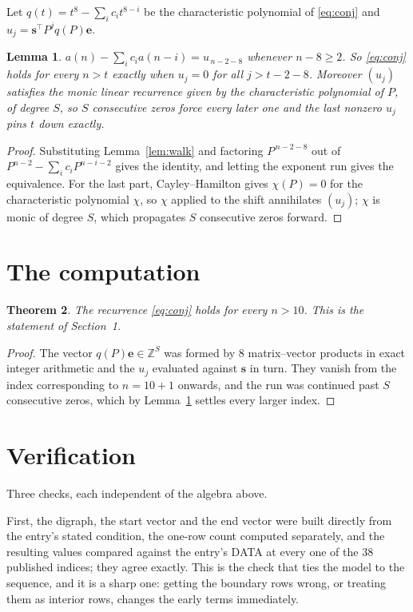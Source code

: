 \documentclass[11pt,a4paper]{article}
\theoremstyle{plain}
\newtheorem{theorem}{Theorem}
\newtheorem{lemma}[theorem]{Lemma}
\theoremstyle{definition}
\begin{document}
Let $q(t)=t^{8}-\sum_i c_i t^{8-i}$ be the characteristic polynomial of
\eqref{eq:conj} and $u_j=\mathbf{s}^{\!\top}P^{j}q(P)\mathbf{e}$.

\begin{lemma}\label{lem:crit}
$a(n)-\sum_i c_i a(n-i)=u_{\,n-2-8}$ whenever $n-8\ge2$. So \eqref{eq:conj}
holds for every $n>t$ exactly when $u_j=0$ for all $j>t-2-8$. Moreover $(u_j)$
satisfies the monic linear recurrence given by the characteristic polynomial of $P$, of
degree $S$, so $S$ consecutive zeros force every later one and the last nonzero $u_j$ pins
$t$ down exactly.
\end{lemma}

\begin{proof}
Substituting Lemma~\ref{lem:walk} and factoring $P^{\,n-2-8}$ out of
$P^{n-2}-\sum_i c_i P^{n-i-2}$ gives the identity, and letting the exponent run gives the
equivalence. For the last part, Cayley--Hamilton gives $\chi(P)=0$ for the characteristic
polynomial $\chi$, so $\chi$ applied to the shift annihilates $(u_j)$; $\chi$ is monic of
degree $S$, which propagates $S$ consecutive zeros forward.
\end{proof}

\section{The computation}

\begin{theorem}
The recurrence \eqref{eq:conj} holds for every $n>10$. This is the statement of
Section~1.
\end{theorem}

\begin{proof}
The vector $q(P)\mathbf{e}\in\mathbb{Z}^{S}$ was formed by $8$ matrix--vector
products in exact integer arithmetic and the $u_j$ evaluated against $\mathbf{s}$ in turn.
They vanish from the index corresponding to $n=10+1$ onwards, and the run was continued
past $S$ consecutive zeros, which by Lemma~\ref{lem:crit} settles every larger index.
\end{proof}

\section{Verification}

Three checks, each independent of the algebra above.

First, the digraph, the start vector and the end vector were built directly from the
entry's stated condition, the one-row count computed separately, and the resulting values
compared against the entry's DATA at every one of the $38$ published indices; they
agree exactly. This is the check that ties the model to the sequence, and it is a sharp one:
getting the boundary rows wrong, or treating them as interior rows, changes the early terms
immediately.
\end{document}
